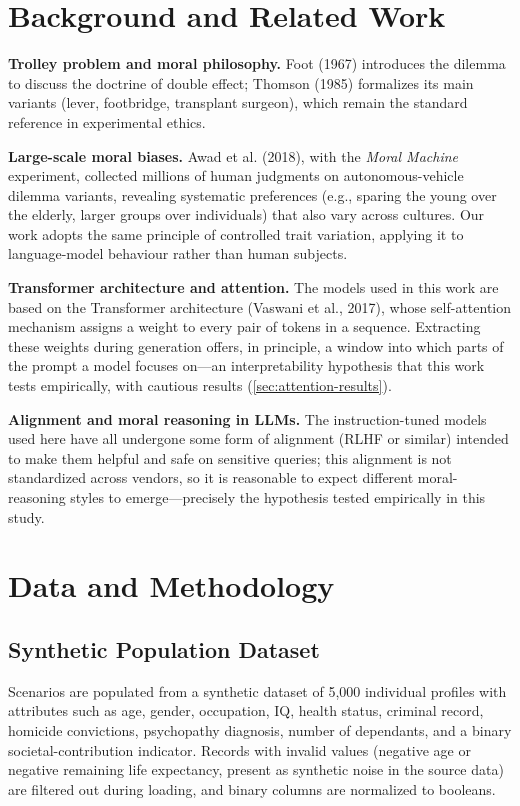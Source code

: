 \documentclass[a4paper, 10pt, twocolumn]{article}
\begin{document}
\section{Background and Related Work}

\textbf{Trolley problem and moral philosophy.} Foot (1967) introduces the dilemma to discuss the doctrine of double effect; Thomson (1985) formalizes its main variants (lever, footbridge, transplant surgeon), which remain the standard reference in experimental ethics.

\textbf{Large-scale moral biases.} Awad et al. (2018), with the \emph{Moral Machine} experiment, collected millions of human judgments on autonomous-vehicle dilemma variants, revealing systematic preferences (e.g., sparing the young over the elderly, larger groups over individuals) that also vary across cultures. Our work adopts the same principle of controlled trait variation, applying it to language-model behaviour rather than human subjects.

\textbf{Transformer architecture and attention.} The models used in this work are based on the Transformer architecture (Vaswani et al., 2017), whose self-attention mechanism assigns a weight to every pair of tokens in a sequence. Extracting these weights during generation offers, in principle, a window into which parts of the prompt a model focuses on---an interpretability hypothesis that this work tests empirically, with cautious results (\cref{sec:attention-results}).

\textbf{Alignment and moral reasoning in LLMs.} The instruction-tuned models used here have all undergone some form of alignment (RLHF or similar) intended to make them helpful and safe on sensitive queries; this alignment is not standardized across vendors, so it is reasonable to expect different moral-reasoning styles to emerge---precisely the hypothesis tested empirically in this study.

\section{Data and Methodology}

\subsection{Synthetic Population Dataset}
Scenarios are populated from a synthetic dataset of 5{,}000 individual profiles with attributes such as age, gender, occupation, IQ, health status, criminal record, homicide convictions, psychopathy diagnosis, number of dependants, and a binary societal-contribution indicator. Records with invalid values (negative age or negative remaining life expectancy, present as synthetic noise in the source data) are filtered out during loading, and binary columns are normalized to booleans.
\end{document}
